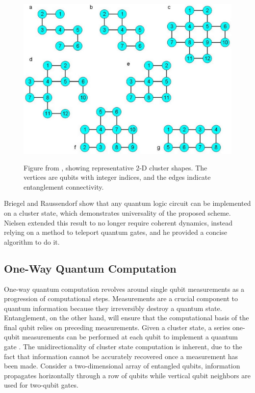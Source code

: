 \documentclass[twocolumn]{IEEEtran11}
\begin{document}
\begin{figure}[thb]
  \centering
  \includegraphics[width=\linewidth]{2d_clusters_rep.jpg}
  \label{2dclustersfig}
  \caption{Figure from \protect\cite{gerald2006efficient}, showing representative 2-D cluster shapes. The vertices are qubits with integer indices, and the edges indicate entanglement connectivity.}
\end{figure}

Briegel and Raussendorf show that any quantum logic circuit can be implemented on a cluster state, which demonstrates universality of the proposed scheme\cite{briegel2000measurements}. Nielsen\cite{nielsen108020universal} extended this result to no longer require coherent dynamics, instead relying on a method to teleport quantum gates, and he provided a concise algorithm to do it. 

\subsection{One-Way Quantum Computation}
One-way quantum computation revolves around single qubit measurements as a progression of computational steps. Measurements are a crucial component to quantum information because they irreversibly destroy a quantum state. Entanglement, on the other hand, will ensure that the computational basis of the final qubit relies on preceding measurements. Given a cluster state, a series one-qubit measurements can be performed at each qubit to implement a quantum gate \cite{jorrand2005unifying}.  The unidirectionality of cluster state computation is inherent, due to the fact that information cannot be accurately recovered once a measurement has been made. Consider a two-dimensional array of entangled qubits, information propagates horizontally through a row of qubits while vertical qubit neighbors are used for two-qubit gates. 
\end{document}
